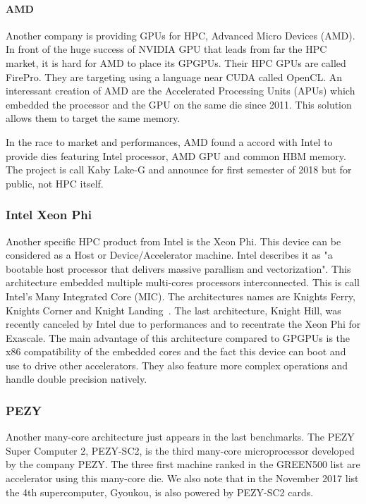 \paragraph{AMD}
Another company is providing GPUs for HPC, Advanced Micro Devices (AMD). 
In front of the huge success of NVIDIA GPU that leads from far the HPC market, it is hard for AMD to place its GPGPUs. 
Their HPC GPUs are called FirePro.
They are targeting using a language near CUDA called OpenCL. 
An interessant creation of AMD are the Accelerated Processing Units (APUs) which embedded the processor and the GPU on the same die since 2011. 
This solution allows them to target the same memory. 

In the race to market and performances, AMD found a accord with Intel to provide dies featuring Intel processor, AMD GPU and common HBM memory. 
The project is call  Kaby Lake-G and announce for first semester of 2018 but for public, not HPC itself. 

\subsubsection{Intel Xeon Phi}
Another specific HPC product from Intel is the Xeon Phi. 
This device can be considered as a Host or Device/Accelerator machine. 
Intel describes it as "a bootable host processor that delivers massive parallism and vectorization".
This architecture embedded multiple multi-cores processors interconnected. 
This is call Intel's Many Integrated Core (MIC).
The architectures names are Knights Ferry, Knights Corner and Knight Landing~\cite{sodani2016knights}. 
The last architecture, Knight Hill, was recently canceled by Intel due to performances and to recentrate the Xeon Phi for Exascale.
The main advantage of this architecture compared to GPGPUs is the x86 compatibility of the embedded cores and the fact this device can boot and use to drive other accelerators. 
They also feature more complex operations and handle double precision natively. 


\subsubsection{PEZY}
Another many-core architecture just appears in the last benchmarks. 
The PEZY Super Computer 2, PEZY-SC2, is the third many-core microprocessor developed by the company PEZY. 
The three first machine ranked in the GREEN500 list are accelerator using this many-core die. 
We also note that in the November 2017 list the 4th supercomputer, Gyoukou, is also powered by PEZY-SC2 cards.

